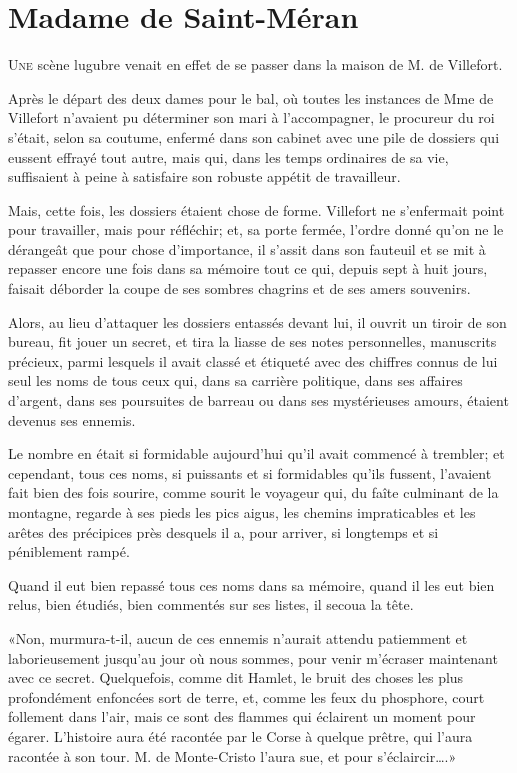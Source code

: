 \chapter{Madame de Saint-Méran}

\lettrine{U}{ne} scène lugubre venait en effet de se passer dans la maison de M. de Villefort. 

\zz
Après le départ des deux dames pour le bal, où toutes les instances de Mme de Villefort n'avaient pu déterminer son mari à l'accompagner, le procureur du roi s'était, selon sa coutume, enfermé dans son cabinet avec une pile de dossiers qui eussent effrayé tout autre, mais qui, dans les temps ordinaires de sa vie, suffisaient à peine à satisfaire son robuste appétit de travailleur. 

Mais, cette fois, les dossiers étaient chose de forme. Villefort ne s'enfermait point pour travailler, mais pour réfléchir; et, sa porte fermée, l'ordre donné qu'on ne le dérangeât que pour chose d'importance, il s'assit dans son fauteuil et se mit à repasser encore une fois dans sa mémoire tout ce qui, depuis sept à huit jours, faisait déborder la coupe de ses sombres chagrins et de ses amers souvenirs. 

Alors, au lieu d'attaquer les dossiers entassés devant lui, il ouvrit un tiroir de son bureau, fit jouer un secret, et tira la liasse de ses notes personnelles, manuscrits précieux, parmi lesquels il avait classé et étiqueté avec des chiffres connus de lui seul les noms de tous ceux qui, dans sa carrière politique, dans ses affaires d'argent, dans ses poursuites de barreau ou dans ses mystérieuses amours, étaient devenus ses ennemis. 

Le nombre en était si formidable aujourd'hui qu'il avait commencé à trembler; et cependant, tous ces noms, si puissants et si formidables qu'ils fussent, l'avaient fait bien des fois sourire, comme sourit le voyageur qui, du faîte culminant de la montagne, regarde à ses pieds les pics aigus, les chemins impraticables et les arêtes des précipices près desquels il a, pour arriver, si longtemps et si péniblement rampé. 

Quand il eut bien repassé tous ces noms dans sa mémoire, quand il les eut bien relus, bien étudiés, bien commentés sur ses listes, il secoua la tête. 

«Non, murmura-t-il, aucun de ces ennemis n'aurait attendu patiemment et laborieusement jusqu'au jour où nous sommes, pour venir m'écraser maintenant avec ce secret. Quelquefois, comme dit Hamlet, le bruit des choses les plus profondément enfoncées sort de terre, et, comme les feux du phosphore, court follement dans l'air, mais ce sont des flammes qui éclairent un moment pour égarer. L'histoire aura été racontée par le Corse à quelque prêtre, qui l'aura racontée à son tour. M. de Monte-Cristo l'aura sue, et pour s'éclaircir\dots.» 

